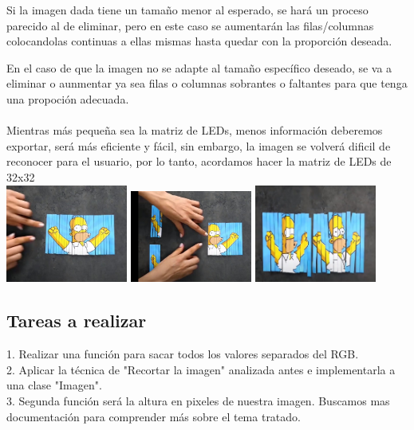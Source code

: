 \documentclass{article}
\begin{document}
Si la imagen dada tiene un tamaño menor al esperado, se hará un proceso parecido al de eliminar, pero en este caso se aumentarán las filas/columnas colocandolas continuas a ellas mismas  hasta quedar con la proporción deseada.

En el caso de que la imagen no se adapte al tamaño específico deseado, se va a eliminar o aunmentar ya sea filas o columnas sobrantes o faltantes para que tenga una propoción adecuada.\\


\\Mientras más pequeña sea la matriz de LEDs, menos información deberemos exportar, será más eficiente y fácil, sin embargo, la imagen se volverá dificil de reconocer para el usuario, por lo tanto, acordamos hacer la matriz de LEDs de 32x32\\


\includegraphics[width=4cm]{Imagenes/recorte1.jpeg}
\includegraphics[width=4cm]{Imagenes/recorte2.jpeg}
\includegraphics[width=4cm]{Imagenes/recorte3.jpeg}


\subsection{Tareas a realizar}
1. Realizar una función para sacar todos los valores separados del RGB.\\
2. Aplicar la técnica de "Recortar la imagen" analizada antes e implementarla a una clase "Imagen".\\
3. Segunda función será la altura en pixeles de nuestra imagen. Buscamos mas documentación para comprender más sobre el tema tratado.\\
\end{document}
